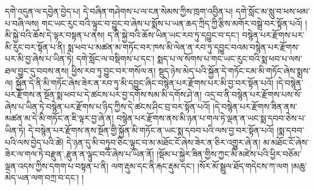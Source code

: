 དགེ་འདུན་ལ་དབྱེན་བྱེད་པ། དེ་བཞིན་གཤེགས་པ་ལ་ངན་སེམས་ཀྱིས་ཁྲག་འབྱིན་པ། དགེ་སློང་མ་སླུ་བ་ཕས་ཕམ་པ་བཞི་ལས། གང་ཡང་རུང་བའི་ལྟུང་བ་བྱུང་བ་ཞེས་པ་སྨོས་པ་ཡན་ཆད་ཀྲིད་ཀྱི་རྩིས་མགོར་བསྒྲེ་བར་སྟོན་པའོ། །མི་སྐྱེ་བའི་ཆོས་དེ་ལྟར་བསྟན་པ་ནས། ད་ནི་སྐྱེ་བའི་ཆོས་ཡིན་ཡང་རབ་ཏུ་དབྱུང་བ་དང་། བསྙེན་པར་རྫོགས་པར་མི་རུང་བར་སྟོན་པ་ནི། སྨ་ཕབ་པ་མཚན་མ་གཏོང་བར་ཁས་མི་ལེན་ན་རབ་ཏུ་དབྱུང་བའམ་བསྙེན་པར་རྫོགས་པར་མི་བྱ་ཞེས་པ་ཡིན་ཏེ། དགེ་སློང་ལ་བསྡིགས་པ་དང་། སྨད་པ་ལ་སོགས་པ་གང་ཡང་རུང་བའི་སྨ་ཕབ་པ་ལས་ཐལ་བྱུང་དུ་བབས་ནས། ཕྱིས་རབ་ཏུ་བྱུང་བར་གསོལ་ན། སྡུད་ཉེས་མེད་པའི་སྐྱོན་དེ་གཏོང་ངམ་མི་གཏོང་ཞེས་སྨྲས་ལ། སྐྱོན་དེ་ནི་མི་གཏོང་ཞེས་ཟེར་ན་རབ་ཏུ་མི་དབྱུང་ཞིང་བསྙེན་པར་རྫོགས་པར་མི་བྱ་བར་སྟོན་པའོ། །དེ་བསྙེན་པར་རྫོགས་ན་སྔོན་སྨ་ཕབ་པ་དེ་ཚངས་པར་བྱ་དགོས་སམ་མི་དགོས་ཤེ་ན། འདྲ་བ་ནི་བསྙེན་པར་རྫོགས་པས་སོ་ཞེས་པ་ཡིན་ཏེ་བསྙེན་པར་རྫོགས་པ་ཉིད་ཀྱིས་དེ་ཚངས་ཤིང་བྲ་བར་སྟོན་པའོ། །དེ་བསྙེན་པར་རྫོགས་ཟིན་ནས་མཚན་མ་དེ་མི་གཏོང་ན་ཇི་ལྟར་བྱ་ཞེ་ན། བསྙེན་པར་རྫོགས་ནས་མི་ཉན་པ་གལ་ཏེ་ལྡན་ན་ཡང་སྨ་དབབ་ཅེས་པ་ཡིན་ཏེ། དེ་བསྙེན་པར་རྫོགས་ནས་སྔོན་གྱི་སྐྱོན་མི་གཏོང་ན་ཡང་སྨ་དབབ་པའི་ལས་བྱ་བར་སྟོན་པའོ། །སྨ་དབབ་པའི་ལས་བྱེད་པའི་ཚེ། དེ་ཉན་དུ་མི་བཏུབ་ཅིང་ལྟུང་བ་མ་མཐོང་ངོ་ཞེས་ཟེར་ན་ཅིར་འགྱུར་ཞེ་ན། མ་མཐོང་ངོ་ཞེས་ཟེར་ལ་གལ་ཏེ་{བརྫུན་,རྫུན་}ན་ལྟུང་བའོ་ཞེས་པ་ཡིན་ནོ། །སྡོམ་པ་སྐྱེར་ཟིན་གྱིས་ཀྱང་མི་མཛེས་པའི་ཕྱིར་བཅོམ་ལྡན་འདས་ཀྱིས་དགག་པ་བསྟན་པ་ནི། ལག་རྡུམ་དང་ནི་རྐང་རྡུམ་དང་། །སོར་མོ་སྦྲུལ་ཐོད་གདེངས་ཀ་ལག །མཆུ་མེད་ཡན་ལག་བཀྲ་བ་དང་། །

